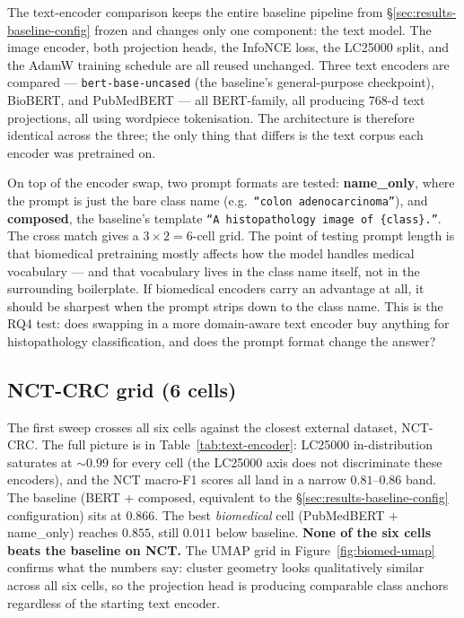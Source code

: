 The text-encoder comparison keeps the entire baseline pipeline from §\ref{sec:results-baseline-config} frozen and changes only one component: the text model. The image encoder, both projection heads, the InfoNCE loss, the LC25000 split, and the AdamW training schedule are all reused unchanged. Three text encoders are compared --- \texttt{bert-base-uncased} (the baseline's general-purpose checkpoint), BioBERT, and PubMedBERT --- all BERT-family, all producing 768-d text projections, all using wordpiece tokenisation. The architecture is therefore identical across the three; the only thing that differs is the text corpus each encoder was pretrained on.

On top of the encoder swap, two prompt formats are tested: \textbf{name\_only}, where the prompt is just the bare class name (e.g.\ \texttt{``colon adenocarcinoma''}), and \textbf{composed}, the baseline's template \texttt{``A histopathology image of \{class\}.''}. The cross match gives a $3 \times 2 = 6$-cell grid. The point of testing prompt length is that biomedical pretraining mostly affects how the model handles medical vocabulary --- and that vocabulary lives in the class name itself, not in the surrounding boilerplate. If biomedical encoders carry an advantage at all, it should be sharpest when the prompt strips down to the class name. This is the RQ4 test: does swapping in a more domain-aware text encoder buy anything for histopathology classification, and does the prompt format change the answer?

\subsection{NCT-CRC grid (6 cells)}

The first sweep crosses all six cells against the closest external dataset, NCT-CRC. The full picture is in Table~\ref{tab:text-encoder}: LC25000 in-distribution saturates at $\sim 0.99$ for every cell (the LC25000 axis does not discriminate these encoders), and the NCT macro-F1 scores all land in a narrow $0.81$--$0.86$ band. The baseline (BERT + composed, equivalent to the §\ref{sec:results-baseline-config} configuration) sits at $0.866$. The best \emph{biomedical} cell (PubMedBERT + name\_only) reaches $0.855$, still $0.011$ below baseline. \textbf{None of the six cells beats the baseline on NCT.} The UMAP grid in Figure~\ref{fig:biomed-umap} confirms what the numbers say: cluster geometry looks qualitatively similar across all six cells, so the projection head is producing comparable class anchors regardless of the starting text encoder.

